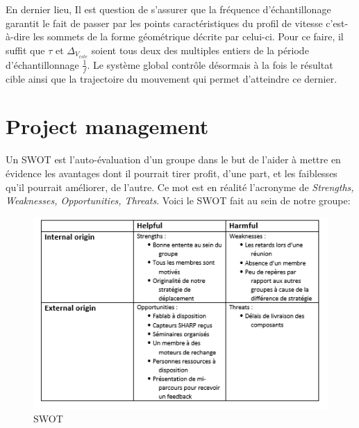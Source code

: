 \documentclass[a4paper,11pt]{article}
\begin{document}
En dernier lieu, Il est question de s'assurer que la fréquence d'échantillonage garantit le fait de passer par les points caractéristiques du profil de vitesse c'est-à-dire les sommets de la forme géométrique décrite par celui-ci. Pour ce faire, il suffit que $\tau$ et $\Delta_{V_{cste}}$ soient tous deux des multiples entiers de la période d'échantillonnage $\frac{1}{f}$.
Le système global contrôle désormais à la fois le résultat cible ainsi que la trajectoire du mouvement qui permet d'atteindre ce dernier. 






\section{Project management}

Un SWOT est l'auto-évaluation d'un groupe dans le but de l'aider à mettre en évidence les avantages dont il pourrait tirer profit, d'une part, et les faiblesses qu'il pourrait améliorer, de l'autre. Ce mot est en réalité l'acronyme de \textit{Strengths, Weaknesses, Opportunities, Threats}. Voici le SWOT fait au sein de notre groupe:
\begin{figure}[H]
    \centering
    \includegraphics[scale = 1]{swot.png}
    \caption{\label{fig:SWOT}SWOT}
\end{figure}
\end{document}
